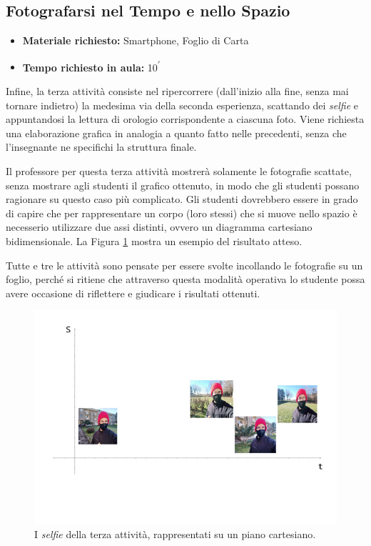 \documentclass{report} \usepackage[T1]{fontenc} \usepackage[italian]{babel}
\begin{document}
\subsection{Fotografarsi nel Tempo e nello Spazio}

\begin{itemize}
\item \textbf{Materiale richiesto:} Smartphone, Foglio di Carta
\item \textbf{Tempo richiesto in aula:} 10\textsuperscript{$\prime$}
\end{itemize}

Infine, la terza attività consiste nel ripercorrere (dall'inizio alla fine,
senza mai tornare indietro) la medesima via della
seconda esperienza, scattando dei \emph{selfie} e appuntandosi la lettura di orologio
corrispondente a ciascuna foto. Viene richiesta una elaborazione grafica in
analogia a quanto fatto nelle precedenti, senza che l’insegnante ne specifichi
la struttura finale.

Il professore per questa terza attività mostrerà solamente le fotografie
scattate, senza mostrare agli studenti il grafico ottenuto, in modo che gli
studenti possano ragionare su questo caso più complicato.
Gli studenti dovrebbero essere in grado di capire che per rappresentare
un corpo (loro stessi) che si muove nello spazio è necesserio utilizzare
due assi distinti, ovvero un diagramma cartesiano bidimensionale.
La Figura \ref{fig:piano_s_t} mostra un esempio del risultato atteso.

Tutte e tre le attività sono pensate per essere svolte incollando le fotografie
su un foglio, perché si ritiene che attraverso questa modalità operativa lo
studente  possa avere occasione di riflettere e giudicare i risultati ottenuti.
\begin{figure}[ht]
\centering
  \includegraphics[width=\textwidth]{piano_s_t}
  \caption{I \emph{selfie} della terza attività, rappresentati
           su un piano cartesiano.}
  \label{fig:piano_s_t}
\end{figure}
\end{document}
